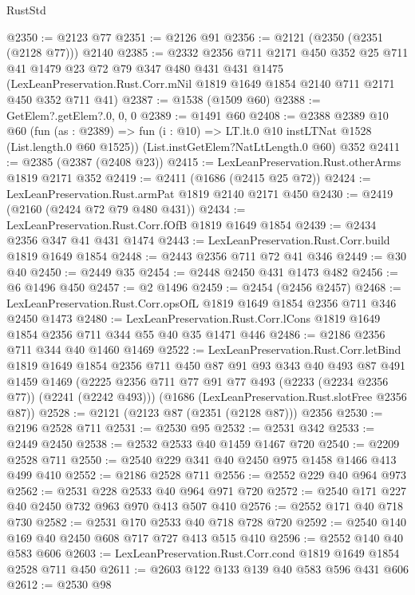 \begin{lexlean}{RustStd}
\begin{coremodule}
@2350 := @2123 @77
@2351 := @2126 @91
@2356 := @2121 (@2350 (@2351 (@2128 @77))) @2140
@2385 := @2332
    @2356
    @711
    @2171
    @450
    @352
    @25
    @711
    @41
    @1479
    @23
    @72
    @79
    @347
    @480
    @431
    @431
    @1475
    (LexLeanPreservation.Rust.Corr.mNil @1819 @1649 @1854 @2140 @711 @2171 @450 @352 @711 @41)
@2387 := @1538 (@1509 @60)
@2388 := GetElem?.getElem?.{0, 0, 0}
@2389 := @1491 @60
@2408 := @2388
    @2389
    @10
    @60
    (fun (as : @2389) => fun (i : @10) => LT.lt.{0} @10 instLTNat @1528 (List.length.{0} @60 @1525))
    (List.instGetElem?NatLtLength.{0} @60)
    @352
@2411 := @2385 (@2387 (@2408 @23))
@2415 := LexLeanPreservation.Rust.otherArms @1819 @2171 @352
@2419 := @2411 (@1686 (@2415 @25 @72))
@2424 := LexLeanPreservation.Rust.armPat @1819 @2140 @2171 @450
@2430 := @2419 (@2160 (@2424 @72 @79 @480 @431))
@2434 := LexLeanPreservation.Rust.Corr.fOfB @1819 @1649 @1854
@2439 := @2434 @2356 @347 @41 @431 @1474
@2443 := LexLeanPreservation.Rust.Corr.build @1819 @1649 @1854
@2448 := @2443 @2356 @711 @72 @41 @346
@2449 := @30 @40
@2450 := @2449 @35
@2454 := @2448 @2450 @431 @1473 @482
@2456 := @6 @1496 @450
@2457 := @2 @1496
@2459 := @2454 (@2456 @2457)
@2468 := LexLeanPreservation.Rust.Corr.opsOfL @1819 @1649 @1854 @2356 @711 @346 @2450 @1473
@2480 := LexLeanPreservation.Rust.Corr.lCons
    @1819
    @1649
    @1854
    @2356
    @711
    @344
    @55
    @40
    @35
    @1471
    @446
@2486 := @2186 @2356 @711 @344 @40 @1460 @1469
@2522 := LexLeanPreservation.Rust.Corr.letBind
    @1819
    @1649
    @1854
    @2356
    @711
    @450
    @87
    @91
    @93
    @343
    @40
    @493
    @87
    @491
    @1459
    @1469
    (@2225 @2356 @711 @77 @91 @77 @493 (@2233 (@2234 @2356 @77)) (@2241 (@2242 @493)))
    (@1686 (LexLeanPreservation.Rust.slotFree @2356 @87))
@2528 := @2121 (@2123 @87 (@2351 (@2128 @87))) @2356
@2530 := @2196 @2528 @711
@2531 := @2530 @95
@2532 := @2531 @342
@2533 := @2449 @2450
@2538 := @2532 @2533 @40 @1459 @1467 @720
@2540 := @2209 @2528 @711
@2550 := @2540 @229 @341 @40 @2450 @975 @1458 @1466 @413 @499 @410
@2552 := @2186 @2528 @711
@2556 := @2552 @229 @40 @964 @973
@2562 := @2531 @228 @2533 @40 @964 @971 @720
@2572 := @2540 @171 @227 @40 @2450 @732 @963 @970 @413 @507 @410
@2576 := @2552 @171 @40 @718 @730
@2582 := @2531 @170 @2533 @40 @718 @728 @720
@2592 := @2540 @140 @169 @40 @2450 @608 @717 @727 @413 @515 @410
@2596 := @2552 @140 @40 @583 @606
@2603 := LexLeanPreservation.Rust.Corr.cond @1819 @1649 @1854 @2528 @711 @450
@2611 := @2603 @122 @133 @139 @40 @583 @596 @431 @606
@2612 := @2530 @98

\end{coremodule}
\end{lexlean}

